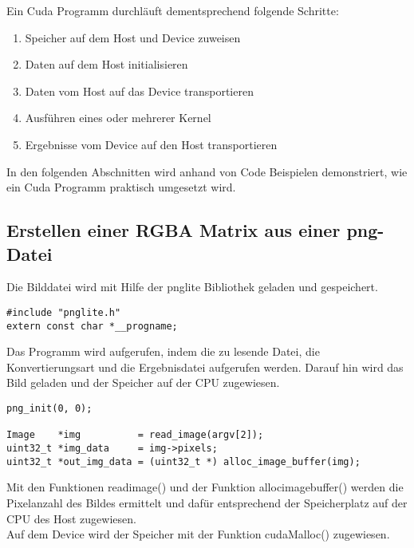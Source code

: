 \documentclass{llncs}
\begin{document}
Ein Cuda Programm durchläuft dementsprechend folgende Schritte:
\begin{enumerate}
	\item Speicher auf dem Host und Device zuweisen
	\item Daten auf dem Host initialisieren
	\item Daten vom Host auf das Device transportieren
	\item Ausführen eines oder mehrerer Kernel
	\item Ergebnisse vom Device auf den Host transportieren
\end{enumerate}

In den folgenden Abschnitten wird anhand von Code Beispielen demonstriert, wie ein Cuda Programm praktisch umgesetzt wird.\\

%
\subsection{Erstellen einer RGBA Matrix aus einer png-Datei}
%
Die Bilddatei wird mit Hilfe der pnglite Bibliothek geladen und gespeichert.
\begin{lstlisting}
#include "pnglite.h"
extern const char *__progname;
\end{lstlisting}

Das Programm wird aufgerufen, indem die zu lesende Datei, die Konvertierungsart und die Ergebnisdatei aufgerufen werden. Darauf hin wird das Bild geladen und der Speicher auf der CPU zugewiesen. \\

\begin{lstlisting}
png_init(0, 0);

Image    *img          = read_image(argv[2]);
uint32_t *img_data     = img->pixels;
uint32_t *out_img_data = (uint32_t *) alloc_image_buffer(img);
\end{lstlisting}

Mit den Funktionen read\textunderscore image() und der Funktion alloc\textunderscore image\textunderscore buffer() werden die Pixelanzahl des Bildes ermittelt und dafür entsprechend der Speicherplatz auf der CPU des Host zugewiesen.\\  

Auf dem Device wird der Speicher mit der Funktion cudaMalloc() zugewiesen.\\ 
\end{document}
